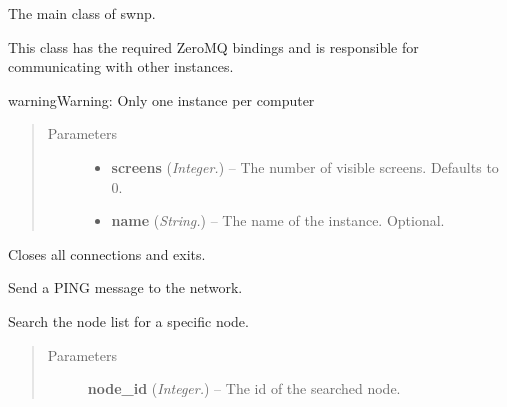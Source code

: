 \documentclass[letterpaper,10pt,english]{sphinxmanual}
\begin{document}
\begin{fulllineitems}
\label{api:swnp.SWNP}
The main class of swnp.

This class has the required ZeroMQ bindings and is responsible for
communicating with other instances.

\begin{notice}{warning}{Warning:}
Only one instance per computer
\end{notice}
\begin{quote}\begin{description}
\item[{Parameters}] \leavevmode\begin{itemize}
\item {} 
\textbf{screens} (\emph{Integer.}) -- The number of visible screens. Defaults to 0.

\item {} 
\textbf{name} (\emph{String.}) -- The name of the instance. Optional.

\end{itemize}

\end{description}\end{quote}

\begin{fulllineitems}
\label{api:swnp.SWNP.close}
Closes all connections and exits.

\end{fulllineitems}


\begin{fulllineitems}
\label{api:swnp.SWNP.do_ping}
Send a PING message to the network.

\end{fulllineitems}


\begin{fulllineitems}
\label{api:swnp.SWNP.find_node}
Search the node list for a specific node.
\begin{quote}\begin{description}
\item[{Parameters}] \leavevmode
\textbf{node\_id} (\emph{Integer.}) -- The id of the searched node.


\end{description}
\end{quote}
\end{fulllineitems}
\end{fulllineitems}
\end{document}

